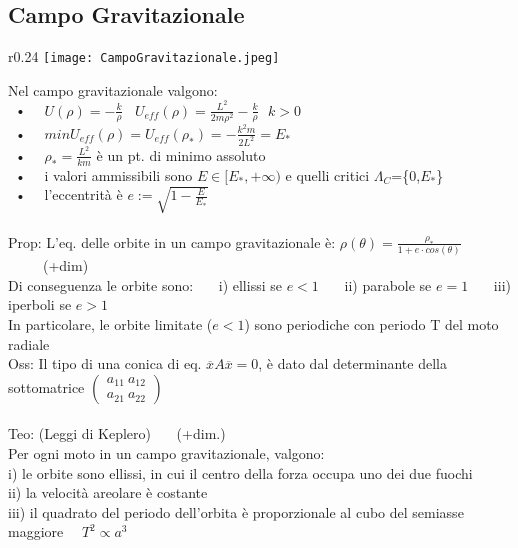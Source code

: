 \documentclass{article}
\theoremstyle{unnumbered}
\theoremstyle{unnumbered1}
\begin{document}

\subsection{Campo Gravitazionale}
%
\begin{wrapfigure}{r}{0.24\textwidth}
\texttt{[image: CampoGravitazionale.jpeg]}
\end{wrapfigure}
Nel campo gravitazionale valgono:\\
\ • \ \ $U(\rho)=-\frac{k}{\rho} \ \ \ \ U_{eff}(\rho)=\frac{L^2}{2m\rho^2}-\frac{k}{\rho} \ \ \ k>0$\\
\ • \ \ $min U_{eff}(\rho)=U_{eff}(\rho_*)=-\frac{k^2m}{2L^2}=E_*$\\
\ • \ \ $\rho_*=\frac{L^2}{km}$  è un pt.\! di minimo assoluto \\
\ • \ \ i valori ammissibili sono $E\in[E_*,+\infty)$ e quelli critici $\Lambda_C$=\{0,$E_*$\}\\
\ • \ \ l'eccentrità è $e:=\sqrt{1-\frac{E}{E_*}}$\\ \\
%
%
%
Prop: L'eq.\! delle orbite in un campo gravitazionale è:  $\rho(\theta)=\frac{\rho_*}{1+e\cdot cos(\theta)}$ \ \ \ \ \ (+dim)\\
\phantom{Prop: }Di conseguenza le orbite sono: \ \ \ i) ellissi se $e<1$ \ \ \ ii) parabole se $e=1$ \ \ \ iii) iperboli se $e>1$\\
\phantom{Prop: }In particolare, le orbite limitate ($e<1$) sono periodiche con periodo T del moto radiale \\
Oss: Il tipo di una conica di eq. $\overline{x}A\overline{x}=0$,    è dato dal determinante della sottomatrice $\begin{pmatrix}a_{11} \ a_{12} \\ a_{21} \ a_{22}\end{pmatrix}$  \\ \\
%
%
%
Teo: (Leggi di Keplero) \ \ \ (+dim.)\\
Per ogni moto in un campo gravitazionale, valgono:\\
i) le orbite sono ellissi, in cui il centro della forza occupa uno dei due fuochi\\
ii) la velocità areolare è costante\\
iii) il quadrato del periodo dell'orbita è proporzionale al cubo del semiasse maggiore \ \ $T^2\propto a^3$\\ \\
\end{document}
